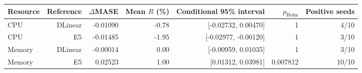 \begin{tabular}{lrrrrrr}
\toprule
Resource & Reference & $\Delta$MASE & Mean $R$ (\%) & Conditional 95\% interval & $p_{\mathrm{Holm}}$ & Positive seeds \\
\midrule
CPU & DLinear & -0.01090 & -0.78 & [-0.02732, 0.00470] & 1 & 4/10 \\
CPU & E5 & -0.01485 & -1.95 & [-0.02977, -0.00120] & 1 & 3/10 \\
Memory & DLinear & -0.00014 & 0.00 & [-0.00959, 0.01035] & 1 & 3/10 \\
Memory & E5 & 0.02523 & 1.00 & [0.01312, 0.03981] & 0.007812 & 10/10 \\
\bottomrule
\end{tabular}
